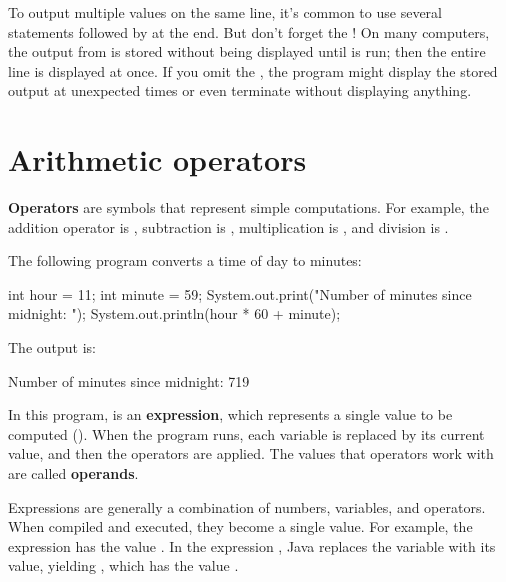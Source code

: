 To output multiple values on the same line, it's common to use several  statements followed by  at the end.
But don't forget the !
On many computers, the output from  is stored without being displayed until  is run; then the entire line is displayed at once.
If you omit the , the program might display the stored output at unexpected times or even terminate without displaying anything.


\section{Arithmetic operators}



{\bf Operators} are symbols that represent simple computations.
For example, the addition operator is \java{+}, subtraction is \java{-}, multiplication is \java{*}, and division is \java{/}.

The following program converts a time of day to minutes:

\begin{code}
int hour = 11;
int minute = 59;
System.out.print("Number of minutes since midnight: ");
System.out.println(hour * 60 + minute);
\end{code}

The output is:

\begin{stdout}
Number of minutes since midnight: 719
\end{stdout}


In this program,  is an {\bf expression}, which represents a single value to be computed ().
When the program runs, each variable is replaced by its current value, and then the operators are applied.
The values that operators work with are called {\bf operands}.

Expressions are generally a combination of numbers, variables, and operators.
When compiled and executed, they become a single value.
For example, the expression  has the value .
In the expression , Java replaces the variable with its value, yielding , which has the value .

